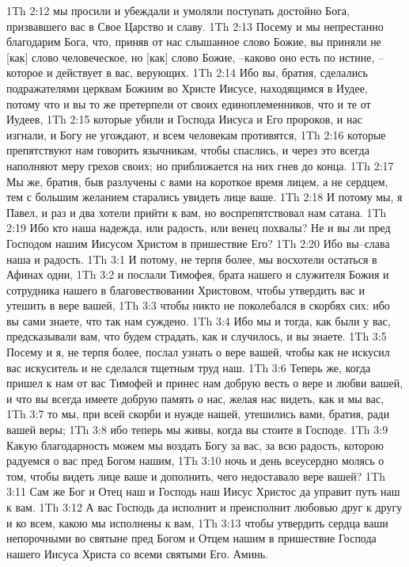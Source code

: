 1Th 2:12  мы просили и убеждали и умоляли поступать достойно Бога, призвавшего вас в Свое Царство и славу.
1Th 2:13  Посему и мы непрестанно благодарим Бога, что, приняв от нас слышанное слово Божие, вы приняли не [как] слово человеческое, но [как] слово Божие, --каково оно есть по истине, --которое и действует в вас, верующих.
1Th 2:14  Ибо вы, братия, сделались подражателями церквам Божиим во Христе Иисусе, находящимся в Иудее, потому что и вы то же претерпели от своих единоплеменников, что и те от Иудеев,
1Th 2:15  которые убили и Господа Иисуса и Его пророков, и нас изгнали, и Богу не угождают, и всем человекам противятся,
1Th 2:16  которые препятствуют нам говорить язычникам, чтобы спаслись, и через это всегда наполняют меру грехов своих; но приближается на них гнев до конца.
1Th 2:17  Мы же, братия, быв разлучены с вами на короткое время лицем, а не сердцем, тем с большим желанием старались увидеть лице ваше.
1Th 2:18  И потому мы, я Павел, и раз и два хотели прийти к вам, но воспрепятствовал нам сатана.
1Th 2:19  Ибо кто наша надежда, или радость, или венец похвалы? Не и вы ли пред Господом нашим Иисусом Христом в пришествие Его?
1Th 2:20  Ибо вы--слава наша и радость.
1Th 3:1  И потому, не терпя более, мы восхотели остаться в Афинах одни,
1Th 3:2  и послали Тимофея, брата нашего и служителя Божия и сотрудника нашего в благовествовании Христовом, чтобы утвердить вас и утешить в вере вашей,
1Th 3:3  чтобы никто не поколебался в скорбях сих: ибо вы сами знаете, что так нам суждено.
1Th 3:4  Ибо мы и тогда, как были у вас, предсказывали вам, что будем страдать, как и случилось, и вы знаете.
1Th 3:5  Посему и я, не терпя более, послал узнать о вере вашей, чтобы как не искусил вас искуситель и не сделался тщетным труд наш.
1Th 3:6  Теперь же, когда пришел к нам от вас Тимофей и принес нам добрую весть о вере и любви вашей, и что вы всегда имеете добрую память о нас, желая нас видеть, как и мы вас,
1Th 3:7  то мы, при всей скорби и нужде нашей, утешились вами, братия, ради вашей веры;
1Th 3:8  ибо теперь мы живы, когда вы стоите в Господе.
1Th 3:9  Какую благодарность можем мы воздать Богу за вас, за всю радость, которою радуемся о вас пред Богом нашим,
1Th 3:10  ночь и день всеусердно молясь о том, чтобы видеть лице ваше и дополнить, чего недоставало вере вашей?
1Th 3:11  Сам же Бог и Отец наш и Господь наш Иисус Христос да управит путь наш к вам.
1Th 3:12  А вас Господь да исполнит и преисполнит любовью друг к другу и ко всем, какою мы исполнены к вам,
1Th 3:13  чтобы утвердить сердца ваши непорочными во святыне пред Богом и Отцем нашим в пришествие Господа нашего Иисуса Христа со всеми святыми Его. Аминь.
